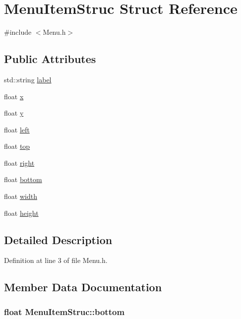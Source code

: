\hypertarget{struct_menu_item_struc}{\section{Menu\-Item\-Struc Struct Reference}
\label{struct_menu_item_struc}
}


{\ttfamily \#include $<$Menu.\-h$>$}

\subsection*{Public Attributes}
\begin{DoxyCompactItemize}
\item 
std\-::string \hyperlink{struct_menu_item_struc_ad9b5a715564f2510db2afc5047520d80}{label}
\item 
float \hyperlink{struct_menu_item_struc_a1835197fea1ec66488b3df6ec9c398da}{x}
\item 
float \hyperlink{struct_menu_item_struc_abb8b4c3d8474a2938defd2cdbea74fa2}{y}
\item 
float \hyperlink{struct_menu_item_struc_a4e5afdbd56bf59391a69dde566b56065}{left}
\item 
float \hyperlink{struct_menu_item_struc_a4b9b11a43fdec82463e1f4eee9eb5a20}{top}
\item 
float \hyperlink{struct_menu_item_struc_a2228c8d93b8d540911f8ba280754a86f}{right}
\item 
float \hyperlink{struct_menu_item_struc_a82e465ea187482b7361106465c0c19df}{bottom}
\item 
float \hyperlink{struct_menu_item_struc_a22efb659c4cc71c564e26858e3c9a4c6}{width}
\item 
float \hyperlink{struct_menu_item_struc_a1a2393a373a4f420e0ddfe8580f2b496}{height}
\end{DoxyCompactItemize}


\subsection{Detailed Description}


Definition at line 3 of file Menu.\-h.



\subsection{Member Data Documentation}
\hypertarget{struct_menu_item_struc_a82e465ea187482b7361106465c0c19df}{
\subsubsection[{bottom}]{\setlength{\rightskip}{0pt plus 5cm}float Menu\-Item\-Struc\-::bottom}}\label{struct_menu_item_struc_a82e465ea187482b7361106465c0c19df}


